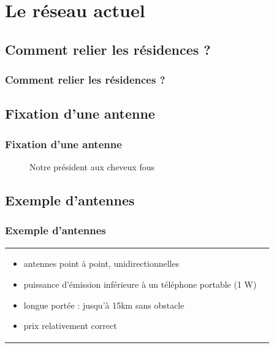 \documentclass[handout]{beamer}
\begin{document}
	\section{Le réseau actuel}

	\subsection{Comment relier les résidences ?}
		\begin{frame}
		\frametitle{Comment relier les résidences ?}
		\vspace{-5px}
		\begin{center}
		\end{center}
		
		\end{frame}

	\subsection{Fixation d'une antenne}
		\begin{frame}
		\frametitle{Fixation d'une antenne}
		\vspace{-5px}
		\begin{center}
			\begin{figure}[h]
				\caption{Notre président aux cheveux fous}
			\end{figure}
		\end{center}
		
		\end{frame}

	\subsection{Exemple d'antennes}
		\begin{frame}
		\frametitle{Exemple d'antennes}
		\begin{tabular}{l l}
			\begin{minipage}{0.4\textwidth}
				\begin{center}
				\end{center}
			\end{minipage}

			\begin{minipage}{0.6\textwidth}
				\begin{itemize}
					\item antennes point à point, unidirectionnelles
					\item puissance d'émission inférieure à un téléphone portable (1 W)
					\item longue portée : jusqu'à 15km sans obstacle
					\item prix relativement correct
				\end{itemize}
			\end{minipage}
			
		\end{tabular}
		\end{frame}
\end{document}
